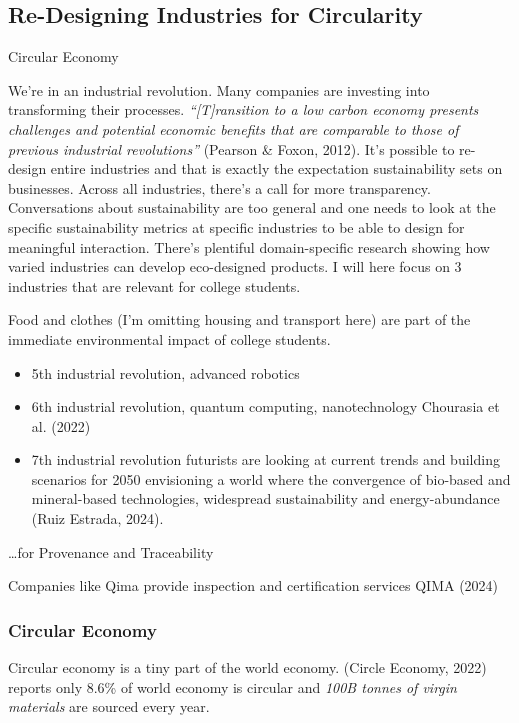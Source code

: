 \documentclass[
  letterpaper,
  DIV=11,
  numbers=noendperiod]{scrartcl}
\providecommand{\tightlist}{%
  \setlength{\itemsep}{0pt}\setlength{\parskip}{0pt}}\usepackage{longtable,booktabs,array}
\begin{document}
\subsection{Re-Designing Industries for
Circularity}\label{re-designing-industries-for-circularity}

Circular Economy

We're in an industrial revolution. Many companies are investing into
transforming their processes. \emph{``{[}T{]}ransition to a low carbon
economy presents challenges and potential economic benefits that are
comparable to those of previous industrial revolutions''} (Pearson \&
Foxon, 2012). It's possible to re-design entire industries and that is
exactly the expectation sustainability sets on businesses. Across all
industries, there's a call for more transparency. Conversations about
sustainability are too general and one needs to look at the specific
sustainability metrics at specific industries to be able to design for
meaningful interaction. There's plentiful domain-specific research
showing how varied industries can develop eco-designed products. I will
here focus on 3 industries that are relevant for college students.

Food and clothes (I'm omitting housing and transport here) are part of
the immediate environmental impact of college students.

\begin{itemize}
\tightlist
\item
  5th industrial revolution, advanced robotics
\item
  6th industrial revolution, quantum computing, nanotechnology Chourasia
  et al. (2022)
\item
  7th industrial revolution futurists are looking at current trends and
  building scenarios for 2050 envisioning a world where the convergence
  of bio-based and mineral-based technologies, widespread sustainability
  and energy-abundance (Ruiz Estrada, 2024).
\end{itemize}

\ldots for Provenance and Traceability

Companies like Qima provide inspection and certification services QIMA
(2024)

\subsubsection{Circular Economy}\label{circular-economy}

Circular economy is a tiny part of the world economy. (Circle Economy,
2022) reports only 8.6\% of world economy is circular and \emph{100B
tonnes of virgin materials} are sourced every year.
\end{document}
